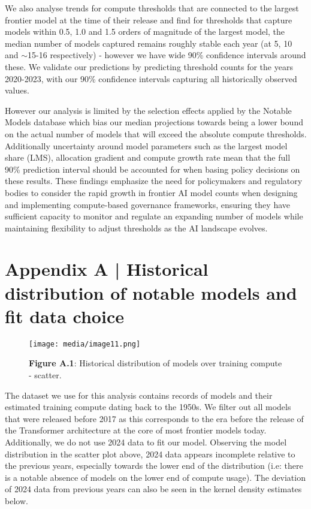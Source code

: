 \documentclass[11pt]{article}
\begin{document}
We also analyse trends for compute thresholds that are connected to the largest frontier model at the time of their release and find for thresholds that capture models within 0.5, 1.0 and 1.5 orders of magnitude of the largest model, the median number of models captured remains roughly stable each year (at 5, 10 and $\sim$15-16 respectively) - however we have wide 90\% confidence intervals around these. We validate our predictions by predicting threshold counts for the years 2020-2023, with our 90\% confidence intervals capturing all historically observed values.

However our analysis is limited by the selection effects applied by the Notable Models database which bias our median projections towards being a lower bound on the actual number of models that will exceed the absolute compute thresholds. Additionally uncertainty around model parameters such as the largest model share (LMS), allocation gradient and compute growth rate mean that the full 90\% prediction interval should be accounted for when basing policy decisions on these results. These findings emphasize the need for policymakers and regulatory bodies to consider the rapid growth in frontier AI model counts when designing and implementing compute-based governance frameworks, ensuring they have sufficient capacity to monitor and regulate an expanding number of models while maintaining flexibility to adjust thresholds as the AI landscape evolves.

\appendix

\section{Appendix A | Historical distribution of notable models and fit data choice}
\label{appendix-a-historical-distribution-of-notable-models-and-fit-data-choice}

\begin{figure}[h]
\centering
\texttt{[image: media/image11.png]}
\caption*{\textbf{Figure A.1}: Historical distribution of models over training compute - scatter.}
\end{figure}

The dataset we use for this analysis contains records of models and their estimated training compute dating back to the 1950s. We filter out all models that were released before 2017 as this corresponds to the era before the release of the Transformer architecture at the core of most frontier models today. Additionally, we do not use 2024 data to fit our model. Observing the model distribution in the scatter plot above, 2024 data appears incomplete relative to the previous years, especially towards the lower end of the distribution (i.e: there is a notable absence of models on the lower end of compute usage). The deviation of 2024 data from previous years can also be seen in the kernel density estimates below.
\end{document}
